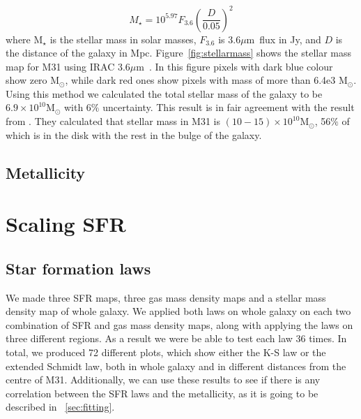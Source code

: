 \documentclass[useAMS,usenatbib]{mn2e}
\newcommand \um    {$\mu$m\ }
\begin{document}
\begin{equation}
\label{equ:eskew}
M _{\star}= 10^{5.97} F_{3.6}\left(\frac{D}{0.05}\right)^2
\end{equation}
where M$_{\star}$ is the stellar mass in solar masses, $F_{3.6}$ is 3.6\um flux in Jy, and $D$ is the distance of the galaxy in Mpc. Figure~\ref{fig:stellarmass} shows the stellar mass map for M31 using IRAC 3.6\um. In this figure pixels with dark blue colour show zero M$_{\odot}$, while dark red ones show pixels with mass of more than 6.4e3 M$_{\odot}$. Using this method we calculated the total stellar mass of the galaxy to be $6.9 \times 10^{10}$M$_{\odot}$ with 6$\%$ uncertainty. This result is in fair agreement with the result from \cite{Tamm12}. They calculated that stellar mass in M31 is $(10-15) \times 10^{10}$M$_{\odot}$, 56$\%$ of which is in the disk with the rest in the bulge of the galaxy.


\subsection{Metallicity}
\section{Scaling SFR}
\subsection{Star formation laws}

We made three SFR maps, three gas mass density maps and a stellar mass density map of whole galaxy. We applied both laws on whole galaxy on each two combination of SFR and gas mass density maps, along with applying the laws on three different regions. As a result we were be able to test each law 36 times. In total, we produced 72 different plots, which show either the K-S law or the extended Schmidt law, both in whole galaxy and in different distances from the centre of M31. Additionally, we can use these results to see if there is any correlation between the SFR laws and the metallicity, as it is going to be described in ~\ref{sec:fitting}.
  
\end{document}
